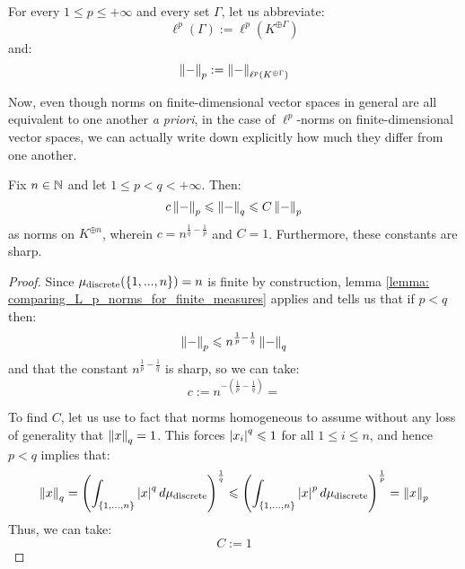         \begin{convention}
            For every $1 \leq p \leq +\infty$ and every set $\Gamma$, let us abbreviate:
                $$\ell^p(\Gamma) := \ell^p(K^{\oplus \Gamma})$$
            and:
                $$\left\| {-} \right\|_p := \left\| {-} \right\|_{\ell^p(K^{\oplus \Gamma})}$$
        \end{convention}

        Now, even though norms on finite-dimensional vector spaces in general are all equivalent to one another \textit{a priori}, in the case of $\ell^p$-norms on finite-dimensional vector spaces, we can actually write down explicitly how much they differ from one another.
        \begin{lemma} \label{lemma: sharp_comparison_of_ell_p_norms_in_finite_dimensions}
            Fix $n \in \mathbb{N}$ and let $1 \leq p < q < +\infty$. Then:
                $$c \left\| {-} \right\|_p \leqslant \left\| {-} \right\|_q \leqslant C \left\| {-} \right\|_p$$
            as norms on $K^{\oplus n}$, wherein $c = n^{\frac1q - \frac1p}$ and $C = 1$. Furthermore, these constants are sharp.
        \end{lemma}
            \begin{proof}
                Since $\mu_{\mathrm{discrete}}(\{1, ..., n\}) = n$ is finite by construction, lemma \ref{lemma: comparing_L_p_norms_for_finite_measures} applies and tells us that if $p < q$ then:
                    $$\left\| {-} \right\|_p \leqslant n^{\frac1p - \frac1q} \left\| {-} \right\|_q$$
                and that the constant $n^{\frac1p - \frac1q}$ is sharp, so we can take:
                    $$c := n^{-(\frac1p - \frac1q)} = $$

                To find $C$, let us use to fact that norms homogeneous to assume without any loss of generality that $\left\| {x} \right\|_q = 1$. This forces $\left\lvert {x_i} \right\rvert^q \leqslant 1$ for all $1 \leq i \leq n$, and hence $p < q$ implies that:
                    $$\left\| {x} \right\|_q = \left( \int_{\{1, ..., n\}} \left\lvert {x} \right\rvert^q d\mu_{\mathrm{discrete}} \right)^{\frac1q} \leqslant \left( \int_{\{1, ..., n\}} \left\lvert {x} \right\rvert^p d\mu_{\mathrm{discrete}} \right)^{\frac1p} = \left\| {x} \right\|_p$$
                Thus, we can take:
                    $$C := 1$$
            \end{proof}



